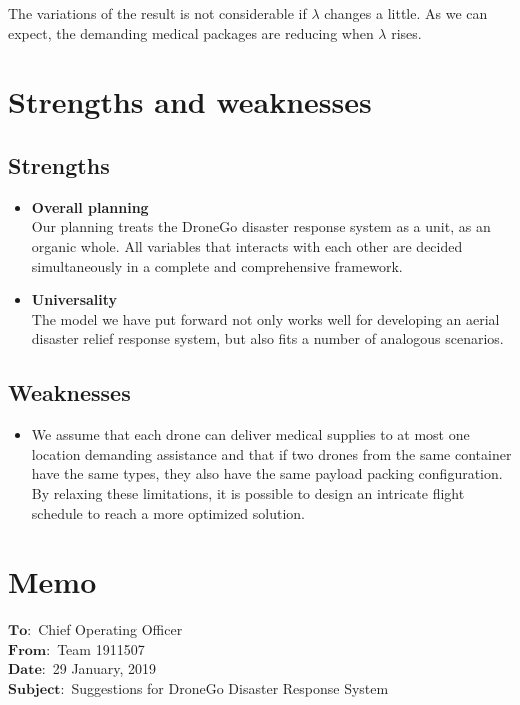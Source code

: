 \documentclass{mcmthesis}
\begin{document}
The variations of the result is not considerable if $\lambda$ changes a little. As we can expect, the demanding medical packages are reducing when $\lambda$ rises.


\section{Strengths and weaknesses}
\subsection{Strengths}
\begin{itemize}
\item \textbf{Overall planning}\\
Our planning treats the DroneGo disaster response system as a unit, as an organic whole. All variables that interacts with each other are decided simultaneously in a complete and comprehensive framework.
\item \textbf{Universality}\\
The model we have put forward not only works well for developing an aerial disaster relief response system, but also fits a number of analogous scenarios.
\end{itemize}
\subsection{Weaknesses}
\begin{itemize}
	\item We assume that each drone can deliver medical supplies to at most one location demanding assistance and that if two drones from the same container have the same types, they also have the same payload packing configuration. By relaxing these limitations, it is possible to design an intricate flight schedule to reach a more optimized solution.
	
\end{itemize}

\newpage 
\section*{Memo}
$\mathbf{To:}$ Chief Operating Officer \\
$\mathbf{From:}$ Team 1911507\\
$\mathbf{Date:}$ 29 January, 2019\\
$\mathbf{Subject:}$ Suggestions for DroneGo Disaster Response System\\
\end{document}
